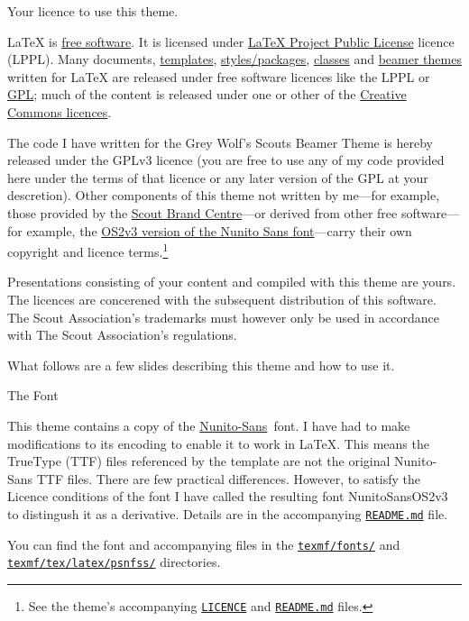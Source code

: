 {
\begin{frame}{Your licence to use this theme.}
\tiny
\parbox{\textwidth}{\LaTeX{} is \href{https://www.debian.org/intro/free}{free software}.
It is licensed under \href{https://www.latex-project.org/lppl/}{LaTeX Project Public License} licence (LPPL). 
Many documents, 
\href{https://www.overleaf.com/gallery/tagged/presentation}{templates}, 
\href{http://www.texfaq.org/FAQ-clsvpkg}{styles/packages}, 
\href{http://www.texfaq.org/FAQ-clsvpkg}{classes} and 
\href{http://tug.ctan.org/macros/latex/contrib/beamer/doc/beameruserguide.pdf\#section.15}{beamer themes} 
written for \LaTeX{} are released under free software licences like the LPPL or \href{https://www.gnu.org/licenses/gpl-3.0.en.html}{GPL}; much of the content is released under one or other of the \href{https://creativecommons.org/}{Creative Commons licences}.}
 
\parbox{\textwidth}{The code I have written for the \alert{Grey Wolf's Scouts Beamer Theme} is hereby released under the GPLv3 licence (you are free to use any of my code provided here under the terms of that licence or any later version of the GPL at your descretion).
Other components of this theme not written by me---for example, those provided by the \href{https://scoutsbrand.org.uk/}{Scout Brand Centre}---or derived from other free software---for example, the \hyperlink{font}{OS2v3 version of the Nunito Sans font}---carry their own copyright and licence terms.\footnote{See the theme's accompanying \href{file:LICENCE}{\tt LICENCE} and \href{file:README.md}{\tt README.md} files.}}

\parbox{\textwidth}{Presentations consisting of your content and compiled with this theme are yours. The licences are concerened with the subsequent distribution of this software. The Scout Association's trademarks must however only be used in accordance with The Scout Association's regulations.}

\parbox{\textwidth}{What follows are a few slides describing this theme and how to use it.}
\end{frame}
}

\begin{frame}{The Font}
\hypertarget{font}{}
\small
\parbox{\textwidth}{This theme contains a copy of the
\href{https://fonts.google.com/specimen/Nunito+Sans}{Nunito-Sans}~font. 
I have had to make modifications to its encoding to enable
it to work in \LaTeX{}.
This means the TrueType (TTF) files referenced by the template are not the original Nunito-Sans TTF files.
There are few practical differences. However, to satisfy the Licence conditions of the font I have called the resulting font NunitoSansOS2v3 to distingush it as a derivative. Details are in the accompanying \href{file:texmf/fonts/truetype/NunitoSans/OS2v3/README.md}{\tt README.md} file. }

\parbox{\textwidth}{You can find the font and accompanying files in the \href{file:texmf/fonts/}{\tt texmf/fonts/}
and \href{file:texmf/tex/latex/psnfss/}{\tt texmf/tex/latex/psnfss/} directories.}
\end{frame}

